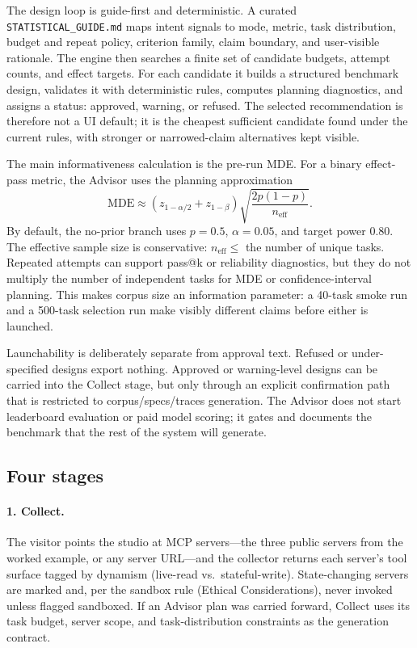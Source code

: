 \documentclass[11pt]{article}
\begin{document}
The design loop is guide-first and deterministic. A curated
\texttt{STATISTICAL\_GUIDE.md} maps intent signals to mode, metric, task
distribution, budget and repeat policy, criterion family, claim boundary, and
user-visible rationale. The engine then searches a finite set of candidate
budgets, attempt counts, and effect targets. For each candidate it builds a
structured benchmark design, validates it with deterministic rules, computes
planning diagnostics, and assigns a status: \textsf{approved},
\textsf{warning}, or \textsf{refused}. The selected recommendation is therefore
not a UI default; it is the cheapest sufficient candidate found under the
current rules, with stronger or narrowed-claim alternatives kept visible.

The main informativeness calculation is the pre-run MDE. For a binary
effect-pass metric, the Advisor uses the planning approximation
\[
  \mathrm{MDE} \approx
  \left(z_{1-\alpha/2} + z_{1-\beta}\right)
  \sqrt{\frac{2p(1-p)}{n_{\mathrm{eff}}}} .
\]
By default, the no-prior branch uses $p=0.5$, $\alpha=0.05$, and target power
$0.80$. The effective sample size is conservative:
$n_{\mathrm{eff}} \leq$ the number of unique tasks. Repeated attempts can
support pass@k or reliability diagnostics, but they do not multiply the number
of independent tasks for MDE or confidence-interval planning. This makes corpus
size an information parameter: a 40-task smoke run and a 500-task selection run
make visibly different claims before either is launched.

Launchability is deliberately separate from approval text. Refused or
under-specified designs export nothing. Approved or warning-level designs can be
carried into the Collect stage, but only through an explicit confirmation path
that is restricted to corpus/specs/traces generation. The Advisor does not start
leaderboard evaluation or paid model scoring; it gates and documents the
benchmark that the rest of the system will generate.

\subsection{Four stages}

\paragraph{1. Collect.} The visitor points the studio at MCP servers---the
three public servers from the worked example, or any server URL---and the
collector returns each server's tool surface tagged by dynamism (live-read
vs.\ stateful-write). State-changing servers are marked and, per the sandbox
rule (Ethical Considerations), never invoked unless flagged sandboxed. If an
Advisor plan was carried forward, Collect uses its task budget, server scope,
and task-distribution constraints as the generation contract.
\end{document}
